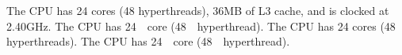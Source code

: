 The CPU has 24 cores (48 hyperthreads), 36MB of L3 cache, and is clocked at 2.40GHz. %
The CPU has 24　core (48　hyperthread).%
The CPU has 24 cores (48 hyperthreads).%
The CPU has 24　core (48　hyperthread).%